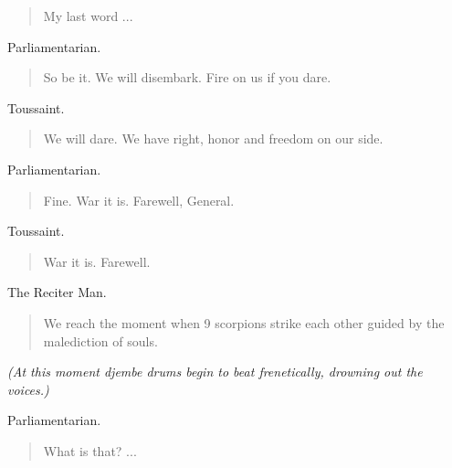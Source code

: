\documentclass[letterpaper,article,12pt,oneside,notitlepage]{memoir}
\begin{document}
\begin{verse}
My last word ... \\
\end{verse}

\begin{center}Parliamentarian.\end{center}

\begin{verse}
So be it. We will disembark. Fire on us if you dare. \\
\end{verse}

\begin{center}Toussaint.\end{center}

\begin{verse}
We will dare. We have right, honor and freedom on our side. \\
\end{verse}

\begin{center}Parliamentarian.\end{center}

\begin{verse}
Fine. War it is. Farewell, General. \\
\end{verse}

\begin{center}Toussaint.\end{center}

\begin{verse}
War it is. Farewell. \\
\end{verse}

\begin{center}The Reciter Man.\end{center}

\begin{verse}
We reach the moment when 9 scorpions strike each other guided by the malediction of souls. \\
\end{verse}

\textit{(At this moment djembe drums begin to beat frenetically, drowning out the voices.)}

\begin{center}Parliamentarian.\end{center}

\begin{verse}
\hspace{1cm} What is that? ... \\
\end{verse}
\end{document}

